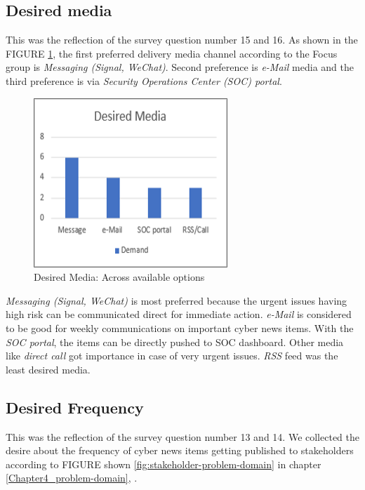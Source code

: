 \subsection{Desired media}
\label{sec:media}
This was the reflection of the survey question number 15 and 16.
As shown in the FIGURE \ref{fig:product-media}, the first preferred delivery media channel according to the Focus group is 
\textit{Messaging (Signal, WeChat)}. 
Second preference is \textit{e-Mail} media and the
third preference is via \textit{Security Operations Center (SOC) portal}. 
\begin{figure}[ht]
    \centering
    \includegraphics[scale=0.6]{Figures/product-media.png}
    \caption{Desired Media: Across available options}
    \label{fig:product-media}
\end{figure}
 \FloatBarrier
\textit{Messaging (Signal, WeChat)} 
is most preferred because the urgent issues having high risk can be communicated direct for immediate action.
\textit{e-Mail} is considered to be good for weekly communications on important cyber news items. 
With the \textit{SOC portal}, 
the items can be directly pushed to SOC dashboard. 
Other media like \textit{direct call} got importance in case of very urgent issues.
\textit{RSS} feed was the least desired media. 




\subsection{Desired Frequency}
\label{sec:frequency}
This was the reflection of the survey question number 13 and 14. We collected the desire about the frequency of cyber news items getting published to stakeholders 
according to FIGURE shown \ref{fig:stakeholder-problem-domain} in chapter \ref{Chapter4_problem-domain}, . 


